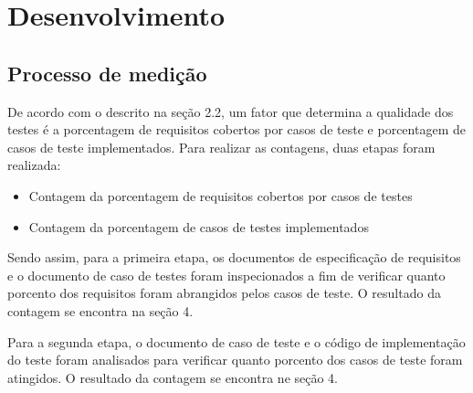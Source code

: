 \chapter[Desenvolvimento ]{Desenvolvimento}

\section{Processo de medição}
De acordo com o descrito na seção 2.2, um fator que determina a qualidade dos testes é a porcentagem de requisitos cobertos por casos de teste e porcentagem de casos de teste implementados. Para realizar as contagens, duas etapas foram realizada:

\begin{itemize}

	\item Contagem da porcentagem de requisitos cobertos por casos de testes
	\item Contagem da porcentagem de casos de testes implementados
	
\end{itemize}

Sendo assim, para a primeira etapa, os documentos de especificação de requisitos e o documento de caso de testes foram inspecionados a fim de verificar quanto porcento dos requisitos foram abrangidos pelos casos de teste. O resultado da contagem se encontra na seção 4.

Para a segunda etapa, o documento de caso de teste e o código de implementação do teste foram analisados para verificar quanto porcento dos casos de teste foram atingidos. O resultado da contagem se encontra ne seção 4.


